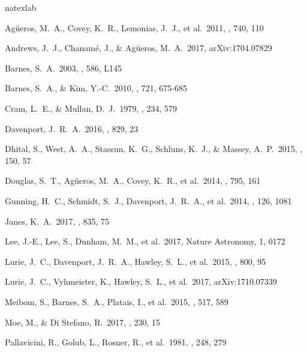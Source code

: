 \documentclass[preprint2]{aastex61}
\begin{document}
\begin{thebibliography}{}
\expandafter\ifx\csname natexlab\endcsname\relax\def\natexlab#1{#1}\fi

 Ag{\"u}eros, M.~A., Covey, K.~R., Lemonias, J.~J., et al.\ 2011, \apj, 740, 110 

 Andrews, J.~J., Chanam{\'e}, J., \& Ag{\"u}eros, M.~A.\ 2017, arXiv:1704.07829 

 Barnes, S.~A.\ 2003, \apjl, 586, L145

 Barnes, S.~A., \& Kim, Y.-C.\ 2010, \apj, 721, 675-685 

 Cram, L.~E., \& Mullan, D.~J.\ 1979, \apj, 234, 579

 Davenport, J.~R.~A.\ 2016, \apj, 829, 23 

 Dhital, S., West, A.~A., Stassun, K.~G., Schluns, K.~J., \& Massey, A.~P.\ 2015, \aj, 150, 57 

 Douglas, S.~T., Ag{\"u}eros, M.~A., Covey, K.~R., et al.\ 2014, \apj, 795, 161

 Gunning, H.~C., Schmidt, S.~J., Davenport, J.~R.~A., et al.\ 2014, \pasp, 126, 1081 

 Janes, K.~A.\ 2017, \apj, 835, 75 

 Lee, J.-E., Lee, S., Dunham, M.~M., et al.\ 2017, Nature Astronomy, 1, 0172 

 Lurie, J.~C., Davenport, J.~R.~A., Hawley, S.~L., et al.\ 2015, \apj, 800, 95 

 Lurie, J.~C., Vyhmeister, K., Hawley, S.~L., et al.\ 2017, arXiv:1710.07339 


 Meibom, S., Barnes, S.~A., Platais, I., et al.\ 2015, \nat, 517, 589 

 Moe, M., \& Di Stefano, R.\ 2017, \apjs, 230, 15 


 Pallavicini, R., Golub, L., Rosner, R., et al.\ 1981, \apj, 248, 279 


\end{thebibliography}
\end{document}
